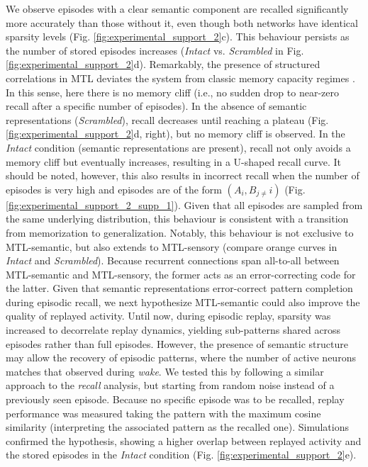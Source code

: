 \documentclass{article}
\begin{document}
We observe episodes with a clear semantic component are recalled significantly more accurately than those without it, even though both networks have identical sparsity levels (Fig. \ref{fig:experimental_support_2}c). This behaviour persists as the number of stored episodes increases (\textit{Intact} vs. \textit{Scrambled} in Fig. \ref{fig:experimental_support_2}d). Remarkably, the presence of structured correlations in MTL deviates the system from classic memory capacity regimes . In this sense, here there is no memory cliff (i.e., no sudden drop to near-zero recall after a specific number of episodes). In the absence of semantic representations (\textit{Scrambled}), recall decreases until reaching a plateau (Fig. \ref{fig:experimental_support_2}d, right), but no memory cliff is observed. In the \textit{Intact} condition (semantic representations are present), recall not only avoids a memory cliff but eventually increases, resulting in a U-shaped recall curve. It should be noted, however, this also results in incorrect recall when the number of episodes is very high and episodes are of the form $(A_i, B_{j\neq}i)$ (Fig. \ref{fig:experimental_support_2_supp_1}). Given that all episodes are sampled from the same underlying distribution, this behaviour is consistent with a transition from memorization to generalization. Notably, this behaviour is not exclusive to MTL-semantic, but also extends to MTL-sensory (compare orange curves in \textit{Intact} and \textit{Scrambled}). Because recurrent connections span all-to-all between MTL-semantic and MTL-sensory, the former acts as an error-correcting code for the latter.
\newline\newline
Given that semantic representations error-correct pattern completion during episodic recall, we next hypothesize MTL-semantic could also improve the quality of replayed activity. Until now, during episodic replay, sparsity was increased to decorrelate replay dynamics, yielding sub-patterns shared across episodes rather than full episodes. However, the presence of semantic structure may allow the recovery of episodic patterns, where the number of active neurons matches that observed during \textit{wake}. We tested this by following a similar approach to the \textit{recall} analysis, but starting from random noise instead of a previously seen episode. Because no specific episode was to be recalled, replay performance was measured taking the pattern with the maximum cosine similarity (interpreting the associated pattern as the recalled one). Simulations confirmed the hypothesis, showing a higher overlap between replayed activity and the stored episodes in the \textit{Intact} condition (Fig. \ref{fig:experimental_support_2}e).
\end{document}
